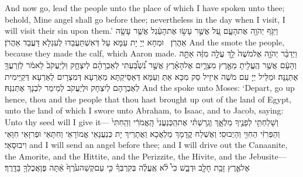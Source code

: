 {And now go, lead the people unto the place of which I have spoken unto thee; behold, Mine angel shall go before thee; nevertheless in the day when I visit, I will visit their sin upon them.’}{}
{וַיִּגֹּ֥ף יְהֹוָ֖ה אֶת\maqqaf הָעָ֑ם עַ֚ל אֲשֶׁ֣ר עָשׂ֣וּ אֶת\maqqaf הָעֵ֔גֶל אֲשֶׁ֥ר עָשָׂ֖ה אַהֲרֹֽן׃ \setuma }
{וּמְחָא יְיָ יָת עַמָּא עַל דְּאִשְׁתַּעֲבַדוּ לְעִגְלָא דַּעֲבַד אַהֲרֹן׃}
{And the \lord\space smote the people, because they made the calf, which Aaron made.}{}
\newperek
{}%
{וַיְדַבֵּ֨ר יְהֹוָ֤ה אֶל\maqqaf מֹשֶׁה֙ לֵ֣ךְ עֲלֵ֣ה מִזֶּ֔ה אַתָּ֣ה וְהָעָ֔ם אֲשֶׁ֥ר הֶֽעֱלִ֖יתָ מֵאֶ֣רֶץ מִצְרָ֑יִם אֶל\maqqaf הָאָ֗רֶץ אֲשֶׁ֣ר נִ֠שְׁבַּ֠עְתִּי לְאַבְרָהָ֨ם לְיִצְחָ֤ק וּֽלְיַעֲקֹב֙ לֵאמֹ֔ר לְזַרְעֲךָ֖ אֶתְּנֶֽנָּה׃}
{וּמַלֵּיל יְיָ עִם מֹשֶׁה אִיזֵיל סַק מִכָּא אַתְּ וְעַמָּא דְּאַסֵּיקְתָּא מֵאַרְעָא דְּמִצְרָיִם לְאַרְעָא דְּקַיֵּימִית לְאַבְרָהָם לְיִצְחָק וּלְיַעֲקֹב לְמֵימַר לִבְנָךְ אֶתְּנִנַּהּ׃}
{And the \lord\space spoke unto Moses: ‘Depart, go up hence, thou and the people that thou hast brought up out of the land of Egypt, unto the land of which I swore unto Abraham, to Isaac, and to Jacob, saying: Unto thy seed will I give it—}{}
{וְשָׁלַחְתִּ֥י לְפָנֶ֖יךָ מַלְאָ֑ךְ וְגֵֽרַשְׁתִּ֗י אֶת\maqqaf הַֽכְּנַעֲנִי֙ הָֽאֱמֹרִ֔י וְהַֽחִתִּי֙ וְהַפְּרִזִּ֔י הַחִוִּ֖י וְהַיְבוּסִֽי׃}
{וְאֶשְׁלַח קֳדָמָךְ מַלְאֲכָא וַאֲתָרֵיךְ יָת כְּנַעֲנָאֵי אֱמוֹרָאֵי וְחִתָּאֵי וּפְרִזָּאֵי חִוָּאֵי וִיבוּסָאֵי׃}
{and I will send an angel before thee; and I will drive out the Canaanite, the Amorite, and the Hittite, and the Perizzite, the Hivite, and the Jebusite—}{}
{אֶל\maqqaf אֶ֛רֶץ זָבַ֥ת חָלָ֖ב וּדְבָ֑שׁ כִּי֩ לֹ֨א אֶֽעֱלֶ֜ה בְּקִרְבְּךָ֗ כִּ֤י עַם\maqqaf קְשֵׁה\maqqaf עֹ֙רֶף֙ אַ֔תָּה פֶּן\maqqaf אֲכֶלְךָ֖ בַּדָּֽרֶךְ׃}
